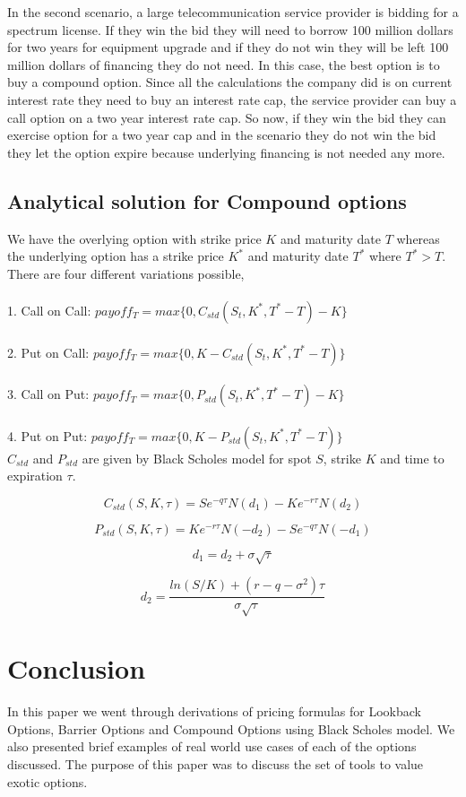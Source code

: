 \documentclass{article}
\begin{document}
In the second scenario, a large telecommunication service provider is bidding for a spectrum license.  If they win the bid they will need to borrow 100 million dollars for two years for equipment upgrade and if they do not win they will be left 100 million dollars of financing they do not need.  In this case, the best option is to buy a compound option.  Since all the calculations the company did is on current interest rate they need to buy an interest rate cap, the service provider can buy a call option on a two year interest rate cap.  So now, if they win the bid they can exercise option for a two year cap and in the scenario they do not win the bid they let the option expire because underlying financing is not needed any more. \\

\subsection{Analytical solution for Compound options
}

We have the overlying option with strike price $K$ and maturity date $T$ whereas the underlying option has a strike price $K^*$ and maturity date $T^*$ where $T^* > T$.\\

There are four different variations possible, \\
\\1. Call on Call: $payoff_T = max\{0,C_{std}(S_t,K^*,T^*-T)-K\}$  \\
\\2. Put on Call:  $payoff_T = max\{0,K-C_{std}(S_t,K^*,T^*-T)\}$\\
\\3. Call on Put: $payoff_T = max\{0,P_{std}(S_t,K^*,T^*-T)-K\}$ \\
\\4. Put on Put:  $payoff_T = max\{0,K-P_{std}(S_t,K^*,T^*-T)\}$\\

$C_{std}$ and $P_{std}$ are given by Black Scholes model for spot $S$, strike $K$ and time to expiration $\tau$.

\[
C_{std}(S,K,\tau) = Se^{-q\tau}N(d_1) - Ke^{-r\tau}N(d_2)
\]

\[
P_{std}(S,K,\tau) = Ke^{-r\tau}N(-d_2) - Se^{-q\tau}N(-d_1)  
\]

\[
d_1 = d_2 + \sigma \sqrt{\tau}
\]

\[
d_2 = \frac{ln(S/K) + (r-q-\sigma^2)\tau}{\sigma \sqrt{\tau}}
\]
\section{Conclusion}
In this paper we went through derivations of pricing formulas for Lookback Options, Barrier Options and Compound Options using Black Scholes model.  We also presented brief examples of real world use cases of each of the options discussed.  The purpose of this paper was to discuss the set of tools to value exotic options.
\end{document}
